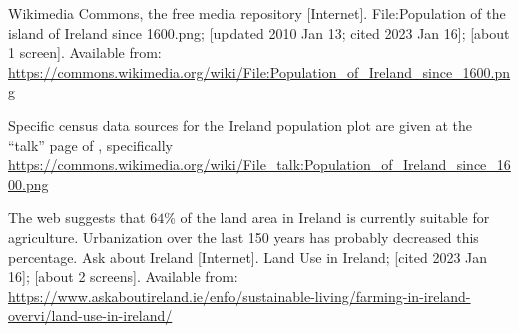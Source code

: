 \documentclass[12pt]{iopart}
\begin{document}
\begin{thebibliography}{99}
Wikimedia Commons, the free media repository [Internet].
File:Population of the island of Ireland since 1600.png;
[updated 2010 Jan 13; cited 2023 Jan 16]; [about 1 screen].
Available from: \url{https://commons.wikimedia.org/wiki/File:Population\_of\_Ireland\_since\_1600.png}

Specific census data sources for the Ireland population plot are given at the ``talk'' page of \cite{pop_image}, specifically
\url{https://commons.wikimedia.org/wiki/File\_talk:Population\_of\_Ireland\_since\_1600.png}

The web suggests that $64\%$ of the land area in Ireland is currently suitable for agriculture.  Urbanization over the last 150 years has probably decreased this percentage.  
Ask about Ireland [Internet].
Land Use in Ireland; [cited 2023 Jan 16]; [about 2 screens].
Available from: \url{https://www.askaboutireland.ie/enfo/sustainable-living/farming-in-ireland-overvi/land-use-in-ireland/}

\end{thebibliography}
\end{document}
